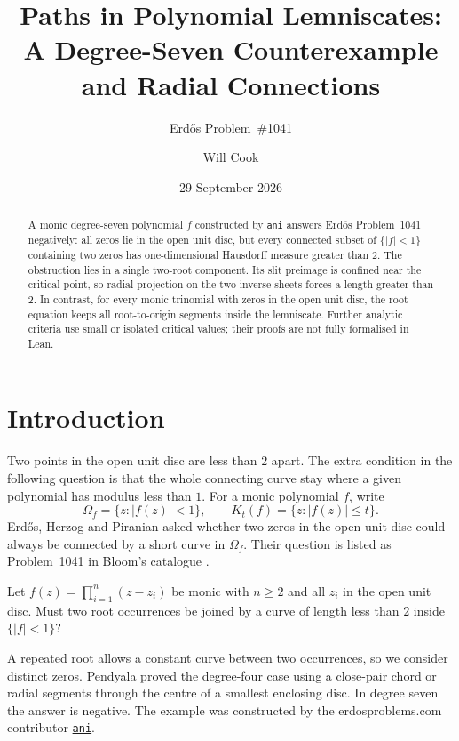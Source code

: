 \documentclass[11pt]{article}
\title{Paths in Polynomial Lemniscates:\\A Degree-Seven Counterexample\\and Radial Connections}
\subtitle{Erd\H{o}s Problem~\#1041}
\author{Will Cook}
\date{29 September 2026}
\begin{document}
\maketitle
\noteprovenance

\begin{abstract}
A monic degree-seven polynomial $f$ constructed by \texttt{ani} answers
Erd\H{o}s Problem~1041 negatively: all zeros lie in the open unit disc,
but every connected subset of $\{|f|<1\}$ containing two zeros has
one-dimensional Hausdorff measure greater than $2$. The obstruction lies in a single two-root
component. Its slit preimage is confined near the critical point, so
radial projection on the two inverse sheets forces a length greater
than $2$. In contrast, for every monic trinomial with zeros in the open
unit disc, the root equation keeps all root-to-origin segments inside
the lemniscate. Further analytic criteria use small or isolated critical
values; their proofs are not fully formalised in Lean.
\end{abstract}

\section{Introduction}\label{sec:problem}

Two points in the open unit disc are less than $2$ apart. The extra
condition in the following question is that the whole connecting curve
stay where a given polynomial has modulus less than $1$.
For a monic polynomial $f$, write
\[
 \Omega_f=\{z:|f(z)|<1\},\qquad K_t(f)=\{z:|f(z)|\le t\}.
\]
Erd\H{o}s, Herzog and Piranian \cite[Problem~5, p.~139]{ehp1958} asked
whether two zeros in the open unit disc could always be connected by a
short curve in $\Omega_f$. Their question is listed as Problem~1041 in
Bloom's catalogue \cite{bloom}.

\begin{problem}[Erd\H{o}s \#1041]\label{res:problem}
Let $f(z)=\prod_{i=1}^{n}(z-z_i)$ be monic with $n\ge2$ and all
$z_i$ in the open unit disc.  Must two root occurrences be joined by a curve
of length less than $2$ inside $\{|f|<1\}$?
\end{problem}

A repeated root allows a constant curve between two occurrences, so we
consider distinct zeros. Pendyala
\cite[Theorem~1 and Lemma~1]{june2026} proved the degree-four case using
a close-pair chord or radial segments through the centre of a smallest
enclosing disc. In degree seven the answer is negative. The example was
constructed by the erdosproblems.com contributor
\href{https://www.erdosproblems.com/forum/thread/1041\#post-8861}{\texttt{ani}}.
\end{document}
